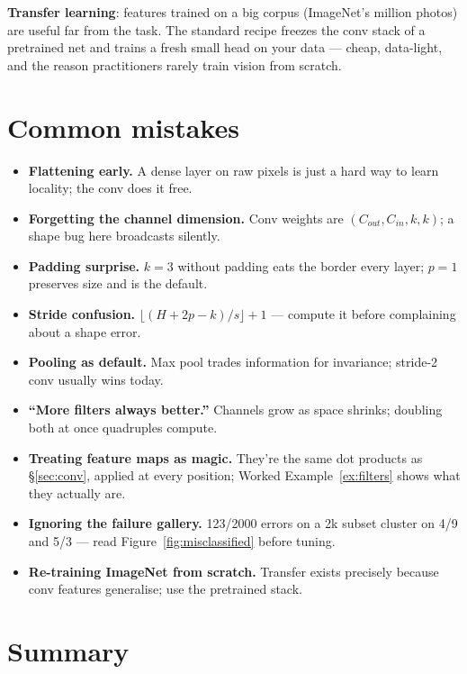\textbf{Transfer learning}: features trained
on a big corpus (ImageNet's million photos) are useful far from the
task. The standard recipe freezes the conv stack of a pretrained net
and trains a fresh small head on your data --- cheap, data-light, and
the reason practitioners rarely train vision from scratch.

\section{Common mistakes}
\label{sec:cnnmistakes}

\begin{itemize}
\item \textbf{Flattening early.} A dense layer on raw pixels is just a
hard way to learn locality; the conv does it free.
\item \textbf{Forgetting the channel dimension.} Conv weights are
$(C_{out}, C_{in}, k, k)$; a shape bug here broadcasts silently.
\item \textbf{Padding surprise.} $k{=}3$ without padding eats the
border every layer; $p{=}1$ preserves size and is the default.
\item \textbf{Stride confusion.} $\lfloor(H+2p-k)/s\rfloor+1$ ---
compute it before complaining about a shape error.
\item \textbf{Pooling as default.} Max pool trades information for
invariance; stride-2 conv usually wins today.
\item \textbf{``More filters always better.''} Channels grow as space
shrinks; doubling both at once quadruples compute.
\item \textbf{Treating feature maps as magic.} They're the same dot
products as \S\ref{sec:conv}, applied at every position; Worked
Example~\ref{ex:filters} shows what they actually are.
\item \textbf{Ignoring the failure gallery.} 123/2000 errors on a
2k subset cluster on 4/9 and 5/3 --- read Figure~\ref{fig:misclassified}
before tuning.
\item \textbf{Re-training ImageNet from scratch.} Transfer exists
precisely because conv features generalise; use the pretrained stack.
\end{itemize}

\section{Summary}
\label{sec:cnnsummary}

